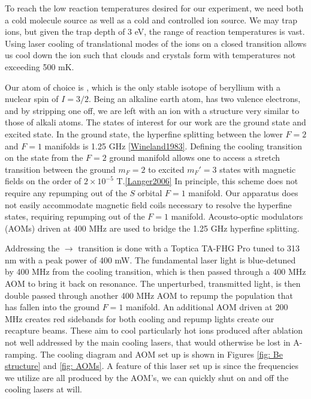 To reach the low reaction temperatures desired for our experiment, we need both a cold molecule source as well as a cold and controlled ion source. We may trap  ions, but given the trap depth of 3 eV, the range of reaction temperatures is vast. Using laser cooling of translational modes of the ions on a closed transition allows us cool down the ion such that clouds and crystals form with temperatures not exceeding 500 mK.\cite{Wineland1979}

Our atom of choice is , which is the only stable isotope of beryllium with a nuclear spin of $I=3/2$. Being an alkaline earth atom,  has two valence electrons, and by stripping one off, we are left with an ion with a structure very similar to those of alkali atoms. The states of interest for our work are the  ground state and  excited state. In the ground state, the hyperfine splitting between the lower $F=2$ and $F=1$ manifolds is 1.25 GHz \ref{Wineland1983}. Defining the cooling transition on the  state from the $F=2$ ground manifold allows one to access a stretch transition between the ground $m_F=2$ to excited $m_F'=3$ states with magnetic fields on the order of $2 \times 10^{-5}$ T.\ref{Langer2006} In principle, this scheme does not require any repumping out of the $S$ orbital $F=1$ manifold. Our apparatus does not easily accommodate magnetic field coils necessary to resolve the hyperfine states, requiring repumping out of the $F=1$ manifold. Acousto-optic modulators (AOMs) driven at 400 MHz are used to bridge the 1.25 GHz hyperfine splitting.

Addressing the $\rightarrow$ transition is done with a Toptica TA-FHG Pro tuned to 313 nm with a peak power of 400 mW. The fundamental laser light is blue-detuned by 400 MHz from the cooling transition, which is then passed through a 400 MHz AOM to bring it back on resonance. The unperturbed, transmitted light, is then double passed through another 400 MHz AOM to repump the population that has fallen into the ground $F=1$ manifold. An additional AOM driven at 200 MHz creates red sidebands for both cooling and repump lights create our recapture beams. These aim to cool particularly hot  ions produced after ablation not well addressed by the main cooling lasers, that would otherwise be lost in A-ramping. The  cooling diagram and AOM set up is shown in Figures \ref{fig: Be structure} and \ref{fig: AOMs}. A feature of this laser set up is since the frequencies we utilize are all produced by the AOM's, we can quickly shut on and off the cooling lasers at will.

